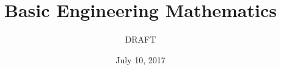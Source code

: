 \documentclass[a4paper,fleqn,12pt]{article}
\title{Basic Engineering Mathematics}
\author{DRAFT}
\date{July 10, 2017}
\begin{document}
\maketitle
\pagebreak
\tableofcontents

\end{document}
